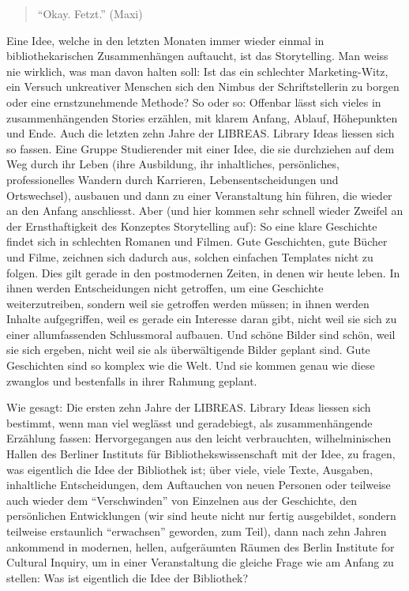 \begin{quote}
\enquote{Okay. Fetzt.} (Maxi)
\end{quote}

Eine Idee, welche in den letzten Monaten immer wieder einmal in
bibliothekarischen Zusammenhängen auftaucht, ist das Storytelling. Man
weiss nie wirklich, was man davon halten soll: Ist das ein schlechter
Marketing-Witz, ein Versuch unkreativer Menschen sich den Nimbus der
Schriftstellerin zu borgen oder eine ernstzunehmende Methode? So oder
so: Offenbar lässt sich vieles in zusammenhängenden Stories erzählen,
mit klarem Anfang, Ablauf, Höhepunkten und Ende. Auch die letzten zehn
Jahre der LIBREAS. Library Ideas liessen sich so fassen. Eine Gruppe
Studierender mit einer Idee, die sie durchziehen auf dem Weg durch ihr
Leben (ihre Ausbildung, ihr inhaltliches, persönliches, professionelles
Wandern durch Karrieren, Lebensentscheidungen und Ortswechsel), ausbauen
und dann zu einer Veranstaltung hin führen, die wieder an den Anfang
anschliesst. Aber (und hier kommen sehr schnell wieder Zweifel an der
Ernsthaftigkeit des Konzeptes Storytelling auf): So eine klare
Geschichte findet sich in schlechten Romanen und Filmen. Gute
Geschichten, gute Bücher und Filme, zeichnen sich dadurch aus, solchen
einfachen Templates nicht zu folgen. Dies gilt gerade in den
postmodernen Zeiten, in denen wir heute leben. In ihnen werden
Entscheidungen nicht getroffen, um eine Geschichte weiterzutreiben,
sondern weil sie getroffen werden müssen; in ihnen werden Inhalte
aufgegriffen, weil es gerade ein Interesse daran gibt, nicht weil sie
sich zu einer allumfassenden Schlussmoral aufbauen. Und schöne Bilder
sind schön, weil sie sich ergeben, nicht weil sie als überwältigende
Bilder geplant sind. Gute Geschichten sind so komplex wie die Welt. Und
sie kommen genau wie diese zwanglos und bestenfalls in ihrer Rahmung
geplant.

Wie gesagt: Die ersten zehn Jahre der LIBREAS. Library Ideas liessen
sich bestimmt, wenn man viel weglässt und geradebiegt, als
zusammenhängende Erzählung fassen: Hervorgegangen aus den leicht
verbrauchten, wilhelminischen Hallen des Berliner Instituts für
Bibliothekswissenschaft mit der Idee, zu fragen, was eigentlich die Idee
der Bibliothek ist; über viele, viele Texte, Ausgaben, inhaltliche
Entscheidungen, dem Auftauchen von neuen Personen oder teilweise auch
wieder dem \enquote{Verschwinden} von Einzelnen aus der Geschichte, den
persönlichen Entwicklungen (wir sind heute nicht nur fertig ausgebildet,
sondern teilweise erstaunlich \enquote{erwachsen} geworden, zum Teil),
dann nach zehn Jahren ankommend in modernen, hellen, aufgeräumten Räumen
des Berlin Institute for Cultural Inquiry, um in einer Veranstaltung die
gleiche Frage wie am Anfang zu stellen: Was ist eigentlich die Idee der
Bibliothek?

